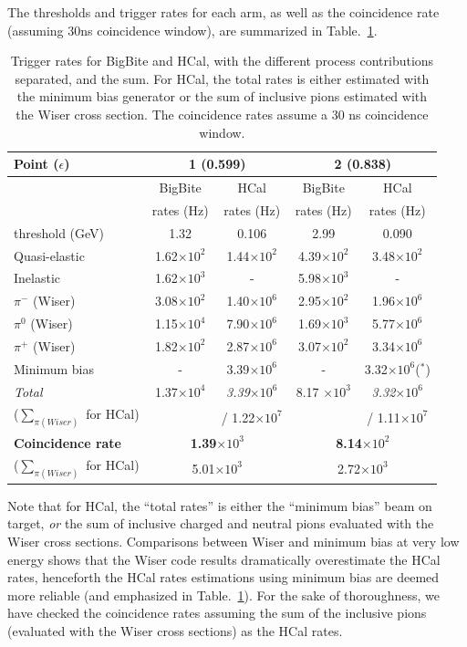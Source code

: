 The thresholds and trigger rates for each arm, as well as the coincidence rate (assuming 30ns coincidence window), are summarized in Table.~\ref{tab:TrigRates}.
\begin{table}[h]
\centering
\begin{tabular}{|l|c|c|c|c|}
\hline
Point ($\epsilon$) & \multicolumn{2}{|c|}{1 (0.599)} & \multicolumn{2}{c|}{2 (0.838)} \\
\hline
& BigBite & HCal & BigBite & HCal \\ 
& rates (Hz) & rates (Hz) & rates (Hz) & rates (Hz) \\
\hline
threshold (GeV) & 1.32 & 0.106 & 2.99 & 0.090 \\
\hline
Quasi-elastic   & 1.62$\times 10^{2}$ & 1.44$\times 10^{2}$ & 4.39$\times 10^{2}$ & 3.48$\times 10^{2}$ \\
Inelastic       & 1.62$\times 10^{3}$ & - & 5.98$\times 10^{3}$ & - \\
$\pi^-$ (Wiser) & 3.08$\times 10^{2}$ & 1.40$\times 10^{6}$ & 2.95$\times 10^{2}$ & 1.96$\times 10^{6}$ \\
$\pi^0$ (Wiser) & 1.15$\times 10^{4}$ & 7.90$\times 10^{6}$ & 1.69$\times 10^{3}$ & 5.77$\times 10^{6}$ \\
$\pi^+$ (Wiser) & 1.82$\times 10^{2}$ & 2.87$\times 10^{6}$ & 3.07$\times 10^{2}$ & 3.34$\times 10^{6}$ \\
Minimum bias    & - & 3.39$\times 10^{6}$ & - & 3.32$\times 10^{6}$($^*$) \\ 
\hline
{\em Total} & 1.37$\times 10^{4}$ & {\em 3.39$\times 10^{6}$} & 8.17 $\times 10^{3}$ & {\em 3.32$\times 10^{6}$} \\
($\sum_{\pi (Wiser)}$ for HCal) &  & / 1.22$\times 10^{7}$  &  & / 1.11$\times 10^{7}$ \\
\hline
{\bf Coincidence rate} & \multicolumn{2}{|c|}{{\bf1.39$\times 10^{3}$}} & \multicolumn{2}{|c|}{{\bf8.14$\times 10^{2}$}} \\
($\sum_{\pi (Wiser)}$ for HCal) & \multicolumn{2}{|c|}{5.01$\times 10^{3}$} & \multicolumn{2}{c|}{2.72$\times 10^{3}$} \\
\hline
\end{tabular} 
\caption{Trigger rates for BigBite and HCal, with the different process contributions separated, and the sum. For HCal, the total rates is either estimated with the minimum bias generator or the sum of inclusive pions estimated with the Wiser cross section. The coincidence rates assume a 30 ns coincidence window.}
\label{tab:TrigRates}
\end{table}
Note that for HCal, the ``total rates'' is either the ``minimum bias'' beam on target, {\em or} the sum of inclusive charged and neutral pions evaluated with the Wiser cross sections. Comparisons between Wiser and minimum bias at very low energy shows that the Wiser code results dramatically overestimate the HCal rates, henceforth the HCal rates estimations using minimum bias are deemed more reliable (and emphasized in Table.~\ref{tab:TrigRates}). For the sake of thoroughness, we have checked the coincidence rates assuming the sum of the inclusive pions (evaluated with the Wiser cross sections) as the HCal rates.


